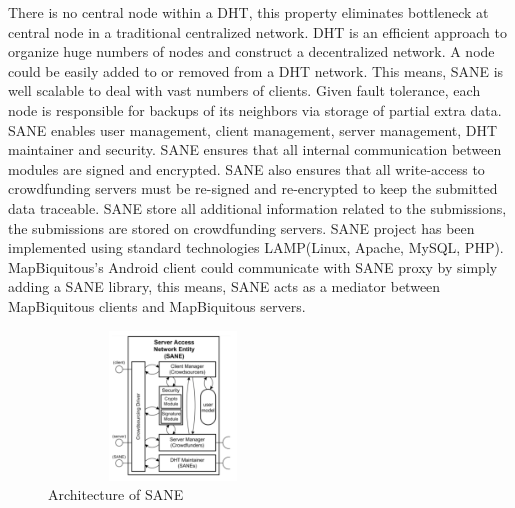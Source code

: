 \documentclass[12pt,oneside,a4paper]{article}
\begin{document}
There is no central node within a DHT, this property eliminates bottleneck at central node in a traditional centralized network. DHT is an efficient approach to organize huge numbers of nodes and construct a decentralized network. A node could be easily added to or removed from a DHT network. This means, SANE is well scalable to deal with vast numbers of clients. Given fault tolerance, each node is responsible for backups of its neighbors via storage of partial extra data. SANE enables user management, client management, server management, DHT maintainer and security. SANE ensures that all internal communication between modules are signed and encrypted. SANE also ensures that all write-access to crowdfunding servers must be re-signed and re-encrypted to keep the submitted data traceable. SANE store all additional information related to the submissions, the submissions are stored on crowdfunding servers. SANE project has been implemented using standard technologies LAMP(Linux, Apache, MySQL, PHP). MapBiquitous's Android client could communicate with SANE proxy by simply adding a SANE library, this means, SANE acts as a mediator between MapBiquitous clients and MapBiquitous servers.
\begin{figure}[htb]
\centering
\includegraphics[width=250px, height=150px]{sane.png}
\caption{Architecture of SANE}
\label{picture-label00}
\end{figure}
\end{document}
